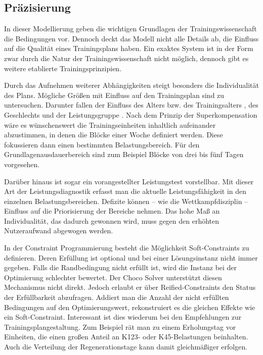 \subsection{Präzisierung}
In dieser Modellierung geben die wichtigen Grundlagen der Trainingswissenschaft die Bedingungen vor. Dennoch deckt das Modell nicht alle Details ab, die Einfluss auf die Qualität eines Trainingsplans haben. Ein exaktes System ist in der Form zwar durch die Natur der Trainingswissenschaft nicht möglich, dennoch gibt es weitere etablierte Trainingsprinzipien. \par
Durch das Aufnehmen weiterer Abhängigkeiten steigt besonders die Individualität des Plans. Mögliche Größen mit Einfluss auf den Trainingsplan sind zu untersuchen. Darunter fallen der Einfluss des Alters bzw. des Trainingsalters \cite[181]{EinfuerungTrainingswissenschaft}, des Geschlechts und der Leistungsgruppe \cite[S. 173]{Radsporttraining}. Nach dem Prinzip der Superkompensation wäre es wünschenswert die Trainingseinheiten inhaltlich aufeinander abzustimmen, in denen die Blöcke einer Woche definiert werden. Diese fokussieren dann einen bestimmten Belastungsbereich. Für den Grundlagenausdauerbereich sind zum Beispiel Blöcke von drei bis fünf Tagen vorgesehen. \par
Darüber hinaus ist sogar ein vorangestellter Leistungstest vorstellbar. Mit dieser Art der Leistungsdiagnostik erfasst man die aktuelle Leistungsfähigkeit in den einzelnen Belastungsbereichen. Defizite können --  wie die Wettkampfdisziplin -- Einfluss auf die Priorisierung der Bereiche nehmen. Das hohe Maß an Individualität, das dadurch gewonnen wird, muss gegen den erhöhten Nutzeraufwand abgewogen werden. \par
In der Constraint Programmierung besteht die Möglichkeit Soft-Constraints zu definieren. Deren Erfüllung ist optional und bei einer Lösungsinstanz nicht immer gegeben. Falls die Randbedingung nicht erfüllt ist, wird die Instanz bei der Optimierung schlechter bewertet. Der Choco Solver unterstützt diesen Mechanismus nicht direkt. Jedoch erlaubt er über Reified-Constraints den Status der Erfüllbarkeit abzufragen. Addiert man die Anzahl der nicht erfüllten Bedingungen auf den Optimierungswert, rekonstruiert es die gleichen Effekte wie ein Soft-Constraint. Interessant ist dies wiederum bei den Empfehlungen zur Trainingsplangestaltung. Zum Beispiel rät man zu einem Erholungstag vor Einheiten, die einen großen Anteil an K123- oder K45-Belastungen beinhalten. Auch die Verteilung der Regenerationstage kann damit gleichmäßiger erfolgen. 

